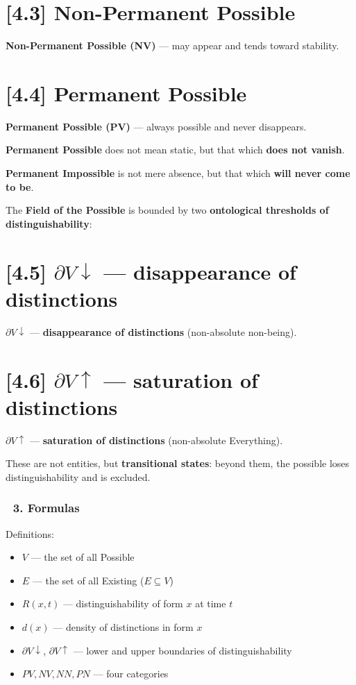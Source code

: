 \documentclass[12pt]{article}
\begin{document}
\section*{[4.3] Non-Permanent Possible}
\textbf{Non-Permanent Possible (NV)} — may appear and tends toward stability.

\section*{[4.4] Permanent Possible}
\textbf{Permanent Possible (PV)} — always possible and never disappears.

\textbf{Permanent Possible} does not mean static, but that which \textbf{does not vanish}.

\textbf{Permanent Impossible} is not mere absence, but that which \textbf{will never come to be}.

The \textbf{Field of the Possible} is bounded by two \textbf{ontological thresholds of distinguishability}:

\section*{[4.5] $\partial V\downarrow$ — disappearance of distinctions}
$\partial V\downarrow$ — \textbf{disappearance of distinctions} (non-absolute non-being).

\section*{[4.6] $\partial V\uparrow$ — saturation of distinctions}
$\partial V\uparrow$ — \textbf{saturation of distinctions} (non-absolute Everything).

These are not entities, but \textbf{transitional states}: beyond them, the possible loses distinguishability and is excluded.

\subsubsection*{🔹 3. Formulas}
Definitions:
\begin{itemize}
\item $V$ — the set of all Possible
\item $E$ — the set of all Existing ($E \subseteq V$)
\item $R(x,t)$ — distinguishability of form $x$ at time $t$
\item $d(x)$ — density of distinctions in form $x$
\item $\partial V\downarrow$, $\partial V\uparrow$ — lower and upper boundaries of distinguishability
\item $PV, NV, NN, PN$ — four categories
\end{itemize}
\end{document}
